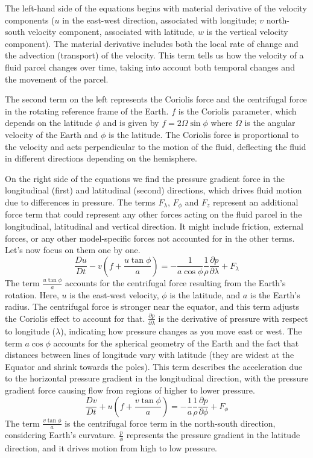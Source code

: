 The left-hand side of the equations begins with material derivative of the velocity components ($u$ in the east-west direction, associated with longitude; $v$ north-south velocity component, associated with latitude, $w$ is the vertical velocity component).
The material derivative includes both the local rate of change and the advection (transport) of the velocity. This term tells us how the velocity of a fluid parcel changes over time, taking into account both temporal changes and the movement of the parcel.

The second term on the left represents the Coriolis force and the centrifugal force in the rotating reference frame of the Earth. $f$ is the Coriolis parameter, which depends on the latitude $\phi$ and is given by $f=2\Omega\sin\phi$ where $\Omega$ is the angular velocity of the Earth and $\phi$ is the latitude. The Coriolis force is proportional to the velocity and acts perpendicular to the motion of the fluid, deflecting the fluid in different directions depending on the hemisphere.

On the right side of the equations we find the pressure gradient force in the longitudinal (first) and latitudinal (second) directions, which drives fluid motion due to differences in pressure. The terms $F_{\lambda}$, $F_{\phi}$ and $F_{z}$ represent an additional force term that could represent any other forces acting on the fluid parcel in the longitudinal, latitudinal and vertical direction. It might include friction, external forces, or any other model-specific forces not accounted for in the other terms.\\

Let's now focus on them one by one.
\begin{equation}
    \frac{Du}{Dt}-v\left(f+\frac{u\tan\phi}{a}\right)=-\frac{1}{a\cos\phi}\frac{1}{\rho}\frac{\partial p}{\partial\lambda}+F_{\lambda}
\end{equation}
The term $\frac{u\tan\phi}{a}$ accounts for the centrifugal force resulting from the Earth's rotation. Here, $u$ is the east-west velocity, $\phi$ is the latitude, and $a$ is the Earth's radius. The centrifugal force is stronger near the equator, and this term adjusts the Coriolis effect to account for that.
$\frac{\partial p}{\partial\lambda}$ is the derivative of pressure with respect to longitude ($\lambda$), indicating how pressure changes as you move east or west. The term $a\cos\phi$ accounts for the spherical geometry of the Earth and the fact that distances between lines of longitude vary with latitude (they are widest at the Equator and shrink towards the poles). This term describes the acceleration due to the horizontal pressure gradient in the longitudinal direction, with the pressure gradient force causing flow from regions of higher to lower pressure.
\begin{equation}
    \frac{Dv}{Dt}+u\left(f+\frac{v\tan\phi}{a}\right)=-\frac{1}{a}\frac{1}{\rho}\frac{\partial p}{\partial\phi}+F_{\phi}
\end{equation}
The term $\frac{v\tan\phi}{a}$ is the centrifugal force term in the north-south direction, considering Earth's curvature. $\frac{p}{\phi}$ represents the pressure gradient in the latitude direction, and it drives motion from high to low pressure.


